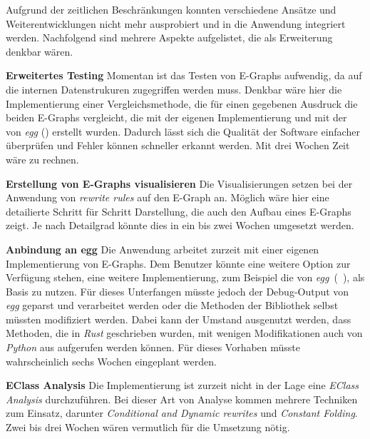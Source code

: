 Aufgrund der zeitlichen Beschränkungen konnten verschiedene Ansätze und Weiterentwicklungen nicht mehr ausprobiert und in die Anwendung integriert werden.
Nachfolgend sind mehrere Aspekte aufgelistet, die als Erweiterung denkbar wären. 

\textbf{Erweitertes Testing} Momentan ist das Testen von E-Graphs aufwendig, da auf die internen Datenstrukuren zugegriffen werden muss.
Denkbar wäre hier die Implementierung einer Vergleichsmethode, die für einen gegebenen Ausdruck die beiden E-Graphs vergleicht,
die mit der eigenen Implementierung und mit der von \textit{egg} (\cite{2021-egg}) erstellt wurden. 
Dadurch lässt sich die Qualität der Software einfacher überprüfen und Fehler können schneller erkannt werden.
Mit drei Wochen Zeit wäre zu rechnen.

\textbf{Erstellung von E-Graphs visualisieren} Die Visualisierungen setzen bei der Anwendung von \textit{rewrite rules} auf den E-Graph an.
Möglich wäre hier eine detailierte Schritt für Schritt Darstellung, die auch den Aufbau eines E-Graphs zeigt. Je nach Detailgrad könnte dies in ein bis zwei Wochen umgesetzt werden.

\textbf{Anbindung an egg} Die Anwendung arbeitet zurzeit mit einer eigenen Implementierung von E-Graphs. Dem Benutzer könnte eine weitere Option zur Verfügung stehen, eine weitere
Implementierung, zum Beispiel die von \textit{egg}~(~\cite{2021-egg}), als Basis zu nutzen.
Für dieses Unterfangen müsste jedoch der Debug-Output von \textit{egg} geparst und verarbeitet werden oder die Methoden der Bibliothek selbst müssten modifiziert werden.
Dabei kann der Umstand ausgenutzt werden, dass Methoden, die in \textit{Rust} geschrieben wurden, mit wenigen Modifikationen auch von \textit{Python} aus aufgerufen werden können.
Für dieses Vorhaben müsste wahrscheinlich sechs Wochen eingeplant werden.

\textbf{EClass Analysis}
Die Implementierung ist zurzeit nicht in der Lage eine \textit{EClass Analysis} durchzuführen. Bei dieser Art von Analyse kommen mehrere Techniken zum Einsatz, darunter
\textit{Conditional and Dynamic rewrites} und \textit{Constant Folding}. Zwei bis drei Wochen wären vermutlich für die Umsetzung nötig.
